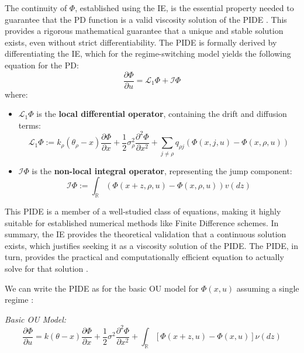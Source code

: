 \documentclass[11pt,twoside,openright]{report}
\begin{document}
The continuity of $\Phi$, established using the IE, is the essential property needed to guarantee that the PD function is a valid viscosity solution of the PIDE \cite{barles2008second}. This provides a rigorous mathematical guarantee that a unique and stable solution exists, even without strict differentiability. The PIDE is formally derived by differentiating the IE, which for the regime-switching model yields the following equation for the PD:
\begin{equation}
\frac{\partial\Phi}{\partial u} = \mathcal{L}_{1}\Phi + \mathcal{I}\Phi
\label{eq:pide_regime_switching_PD}
\end{equation}
where:
\begin{itemize}
    \item $\mathcal{L}_{1}\Phi$ is the \textbf{local differential operator}, containing the drift and diffusion terms:
    $$
    \mathcal{L}_{1}\Phi := k_{\rho}(\theta_{\rho}-x)\frac{\partial\Phi}{\partial x} + \frac{1}{2}\sigma_{\rho}^{2}\frac{\partial^{2}\Phi}{\partial x^{2}} + \sum_{j\ne\rho}q_{\rho j}(\Phi(x,j,u)-\Phi(x,\rho,u))
    $$
    \item $\mathcal{I}\Phi$ is the \textbf{non-local integral operator}, representing the jump component:
    $$
    \mathcal{I}\Phi := \int_{\mathbb{R}}(\Phi(x+z,\rho,u)-\Phi(x,\rho,u))v(dz)
    $$
\end{itemize}
This PIDE is a member of a well-studied class of equations, making it highly suitable for established numerical methods like Finite Difference schemes. In summary, the IE provides the theoretical validation that a continuous solution exists, which justifies seeking it as a viscosity solution of the PIDE. The PIDE, in turn, provides the practical and computationally efficient equation to actually solve for that solution \cite{cont2005finite}.


We can write the PIDE as for the basic OU model for $\Phi(x, u)$ assuming a single regime \cite{georgiou2023thesis}:

\textit{Basic OU Model:}
\begin{equation}
\frac{\partial \Phi}{\partial u} = k(\theta - x)\frac{\partial \Phi}{\partial x} + \frac{1}{2}\sigma^2 \frac{\partial^2 \Phi}{\partial x^2} + \int_{\mathbb{R}} [\Phi(x+z, u) - \Phi(x, u)] \nu(dz)
\label{eq:pide_basic_ou}
\end{equation}
\end{document}
